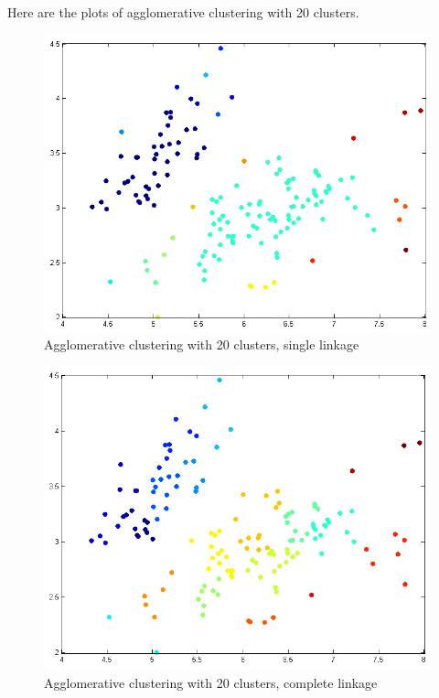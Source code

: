 \documentclass[twoside,11pt]{article}
\theoremstyle{definition}
\begin{document}
\newpage

Here are the plots of agglomerative clustering with 20 clusters.  
\begin{figure}[h]
\centering
\includegraphics[width=6 in]{prob1PartC_3.png}
\caption{Agglomerative clustering with 20 clusters, single linkage}
\end{figure}

\newpage

\begin{figure}[h]
\centering
\includegraphics[width=6 in]{prob1PartC_4.png}
\caption{Agglomerative clustering with 20 clusters, complete linkage}
\end{figure}
\end{document}
